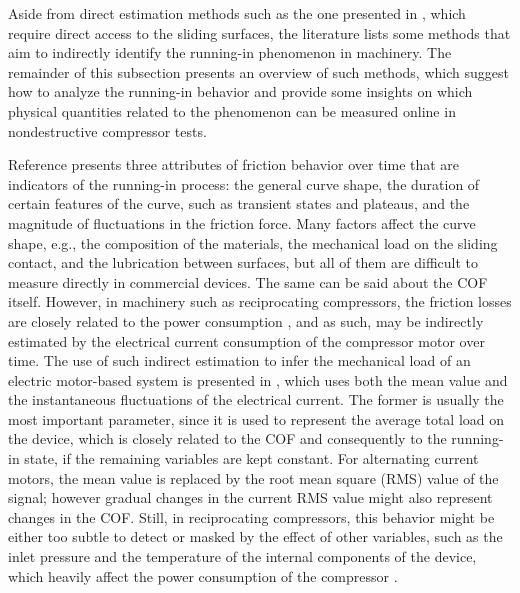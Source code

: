 \documentclass[preprint,11pt,number]{elsarticle}
\begin{document}
Aside from direct estimation methods such as the one presented in \cite{Vojtov2019}, which require direct access to the sliding surfaces, the literature lists some methods that aim to indirectly identify the running-in phenomenon in machinery. The remainder of this subsection presents an overview of such methods, which suggest how to analyze the running-in behavior and provide some insights on which physical quantities related to the phenomenon can be measured online in nondestructive compressor tests.

Reference \cite{Blau2009} presents three attributes of friction behavior over time that are indicators of the running-in process: the general curve shape, the duration of certain features of the curve, such as transient states and plateaus, and the magnitude of fluctuations in the friction force. Many factors affect the curve shape, e.g., the composition of the materials, the mechanical load on the sliding contact, and the lubrication between surfaces, but all of them are difficult to measure directly in commercial devices. The same can be said about the COF itself. However, in machinery such as reciprocating compressors, the friction losses are closely related to the power consumption \cite{Lilie1990}, and as such, may be indirectly estimated by the electrical current consumption of the compressor motor over time. The use of such indirect estimation to infer the mechanical load of an electric motor-based system is presented in \cite{eissenberg_ASM_currentAnalysis}, which uses both the mean value and the instantaneous fluctuations of the electrical current. The former is usually the most important parameter, since it is used to represent the average total load on the device, which is closely related to the COF and consequently to the running-in state, if the remaining variables are kept constant. For alternating current motors, the mean value is replaced by the root mean square (RMS) value of the signal; however gradual changes in the current RMS value might also represent changes in the COF. Still, in reciprocating compressors, this behavior might be either too subtle to detect or masked by the effect of other variables, such as the inlet pressure and the temperature of the internal components of the device, which heavily affect the power consumption of the compressor \cite{Hanlon2001}.
\end{document}
